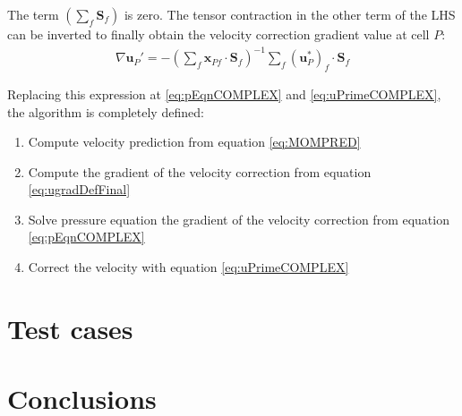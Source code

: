 \documentclass[final,3p,times,10pt,onecolumn]{myElsarticle}
\numberwithin{equation}{section}
\begin{document}
The term $\left(\sum_f \boldsymbol{S}_f\right)$ is zero. The tensor contraction in the other term of the LHS can be inverted to finally obtain the velocity correction gradient value at cell $P$:
\begin{equation}\label{eq:ugradDefFinal}
\begin{split}
\nabla \boldsymbol{u}_P' = -
\left(\sum_f \boldsymbol{x}_{Pf} \cdot \boldsymbol{S}_f\right)^{-1} \sum_f \left(\boldsymbol{u}_P^{*}\right)_f \cdot \boldsymbol{S}_f
\end{split}
\end{equation}

Replacing this expression at \ref{eq:pEqnCOMPLEX} and \ref{eq:uPrimeCOMPLEX}, the algorithm is completely defined:

\begin{enumerate}
\item Compute velocity prediction from equation \ref{eq:MOMPRED}
\item Compute the gradient of the velocity correction  from equation \ref{eq:ugradDefFinal}
\item Solve pressure equation  the gradient of the velocity correction from equation \ref{eq:pEqnCOMPLEX}
\item Correct the velocity with equation \ref{eq:uPrimeCOMPLEX}
\end{enumerate}

\section{Test cases}
\label{sec:cases}

\section{Conclusions}
\label{sec:conclusions}



\end{document}
